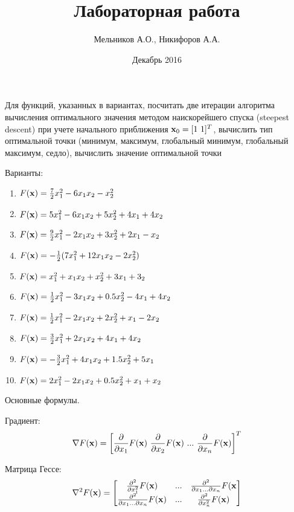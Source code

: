 \documentclass[a4paper]{report}
\begin{document}
\title{Лабораторная работа}
\author{Мельников А.О., Никифоров А.А.}
\date{Декабрь 2016}
\maketitle

Для функций, указанных в вариантах, посчитать две итерации алгоритма вычисления оптимального значения методом наискорейшего спуска (steepest descent) при
учете начального приближения ${{\bf x}_0 = [1\ 1]^T}$, вычислить тип оптимальной точки (минимум, максимум, глобальный минимум, глобальный максимум, седло),
вычислить значение оптимальной точки

Варианты:
\begin{enumerate}
    \item ${F({\bf x}) = \frac{7}{2}x_1^2 - 6 x_{1} x_{2} - x_2^2}$
    \item ${F({\bf x}) = 5x_1^2 -6x_1x_2 +5x_2^2 + 4x_1 +4x_2}$
    \item ${F({\bf x}) = \frac{9}{2}x_1^2 - 2x_1x_2 + 3x_2^2 + 2x_1 - x_2}$
    \item ${F({\bf x}) = -\frac{1}{2}(7x_1^2 + 12x_1x_2 - 2x_2^2)}$
    \item ${F({\bf x}) = x_1^2 + x_1x_2 + x_2^2 + 3x_1 + 3_2}$
    \item ${F({\bf x}) = \frac{1}{2}x_1^2 - 3x_1x_2 + 0.5x_2^2 - 4x_1 + 4x_2}$
    \item ${F({\bf x}) = \frac{1}{2}x_1^2 - 2x_1x_2 + 2x_2^2 + x_1 - 2x_2}$
    \item ${F({\bf x}) = \frac{3}{2}x_1^2 + 2x_1x_2 + 4x_1 + 4x_2}$
    \item ${F({\bf x}) = -\frac{3}{2}x_1^2 + 4x_1x_2 + 1.5x_2^2 + 5x_1}$
    \item ${F({\bf x}) = 2x_1^2 - 2x_1x_2 + 0.5x_2^2 + x_1 + x_2}$
\end{enumerate}

Основные формулы.

Градиент:
\begin{eqnarray}
    \nabla F({\bf x}) = \left[\frac{\partial}{\partial x_1}F({\bf x})\ \frac{\partial}{\partial x_2}F({\bf x})\ ...\ \frac{\partial}{\partial x_n}F({\bf x})\right]^T
\end{eqnarray}

Матрица Гессе:
\begin{eqnarray}
    \nabla^2 F({\bf x}) = 
    \left[
    \begin{matrix}
        \frac{\partial^2}{\partial x_1^2}F({\bf x}) & ... & \frac{\partial^2}{\partial x_1 ... \partial x_n}F({\bf x} \\
        \frac{\partial^2}{\partial x_1 ... \partial x_n}F({\bf x}) & ... & \frac{\partial^2}{\partial x_n^2}F({\bf x})
    \end{matrix}
    \right]
\end{eqnarray}
\end{document}
